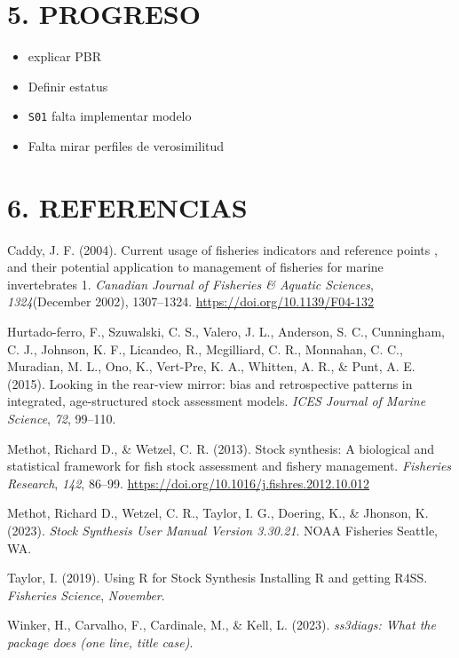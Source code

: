 \documentclass[
]{article}
\newlength{\cslhangindent}
\newlength{\cslentryspacingunit} %
\newenvironment{CSLReferences}[2] %
 {%
  \setlength{\parindent}{0pt}
  \ifodd #1
  \let\oldpar\par
  \def\par{\hangindent=\cslhangindent\oldpar}
  \fi
  \setlength{\parskip}{#2\cslentryspacingunit}
 }%
 {}
\begin{document}
\pagebreak

\hypertarget{progreso}{%
\section{5. PROGRESO}\label{progreso}}

\begin{itemize}
\item
  explicar PBR
\item
  Definir estatus
\item
  \texttt{S01} falta implementar modelo
\item
  Falta mirar perfiles de verosimilitud
\end{itemize}

\pagebreak

\hypertarget{referencias}{%
\section*{6. REFERENCIAS}\label{referencias}}

\hypertarget{refs}{}
\begin{CSLReferences}{1}{0}
\leavevmode{}%
Caddy, J. F. (2004). {Current usage of fisheries indicators and reference points , and their potential application to management of fisheries for marine invertebrates 1}. \emph{Canadian Journal of Fisheries {\&} Aquatic Sciences}, \emph{1324}(December 2002), 1307--1324. \url{https://doi.org/10.1139/F04-132}

\leavevmode{}%
Hurtado-ferro, F., Szuwalski, C. S., Valero, J. L., Anderson, S. C., Cunningham, C. J., Johnson, K. F., Licandeo, R., Mcgilliard, C. R., Monnahan, C. C., Muradian, M. L., Ono, K., Vert-Pre, K. A., Whitten, A. R., \& Punt, A. E. (2015). {Looking in the rear-view mirror: bias and retrospective patterns in integrated, age-structured stock assessment models}. \emph{ICES Journal of Marine Science}, \emph{72}, 99--110.

\leavevmode{}%
Methot, Richard D., \& Wetzel, C. R. (2013). {Stock synthesis: A biological and statistical framework for fish stock assessment and fishery management}. \emph{Fisheries Research}, \emph{142}, 86--99. \url{https://doi.org/10.1016/j.fishres.2012.10.012}

\leavevmode{}%
Methot, Richard D., Wetzel, C. R., Taylor, I. G., Doering, K., \& Jhonson, K. (2023). \emph{{Stock Synthesis User Manual Version 3.30.21}}. NOAA Fisheries Seattle, WA.

\leavevmode{}%
Taylor, I. (2019). {Using R for Stock Synthesis Installing R and getting R4SS}. \emph{Fisheries Science}, \emph{November}.

\leavevmode{}%
Winker, H., Carvalho, F., Cardinale, M., \& Kell, L. (2023). \emph{ss3diags: What the package does (one line, title case)}.

\end{CSLReferences}
\end{document}
